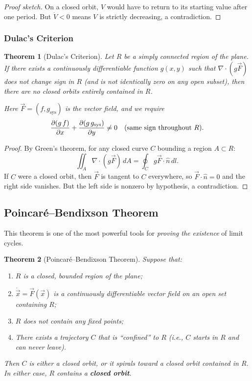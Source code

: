 \documentclass[11pt,letterpaper]{article}
\theoremstyle{definition}
\theoremstyle{plain}
\newtheorem{theorem}{Theorem}[section]
\theoremstyle{remark}
\begin{document}
\begin{proof}[Proof sketch]
On a closed orbit, $V$ would have to return to its starting value after one
period.  But $\dot{V}<0$ means $V$ is strictly decreasing, a contradiction.
\end{proof}

\subsubsection{Dulac's Criterion}

\begin{theorem}[Dulac's Criterion]\label{thm:dulac}
Let $R$ be a simply connected region of the plane.  If there exists a
continuously differentiable function $g(x,y)$ such that
$\nabla\cdot(g\vec{F})$ does not change sign in $R$ (and is not
identically zero on any open subset), then there are no closed orbits
entirely contained in $R$.

Here $\vec{F} = (f, g_{\text{sys}})$ is the vector field, and we require
\begin{equation}
  \pdv{(g\,f)}{x} + \pdv{(g\,g_{\text{sys}})}{y} \neq 0
  \quad\text{(same sign throughout $R$)}.
\end{equation}
\end{theorem}
\begin{proof}
By Green's theorem, for any closed curve $C$ bounding a region $A\subset R$:
\[
  \iint_A \nabla\cdot(g\vec{F})\,dA = \oint_C g\vec{F}\cdot\hat{n}\,dl.
\]
If $C$ were a closed orbit, then $\vec{F}$ is tangent to $C$ everywhere, so
$\vec{F}\cdot\hat{n}=0$ and the right side vanishes.  But the left side is
nonzero by hypothesis, a contradiction.
\end{proof}

\subsection{Poincar\'e--Bendixson Theorem}

This theorem is one of the most powerful tools for \emph{proving the
existence} of limit cycles.

\begin{theorem}[Poincar\'e--Bendixson Theorem]\label{thm:PB}
Suppose that:
\begin{enumerate}[leftmargin=2em]
\item $R$ is a closed, bounded region of the plane;
\item $\dot{\vec{x}} = \vec{F}(\vec{x})$ is a continuously differentiable
      vector field on an open set containing $R$;
\item $R$ does not contain any fixed points;
\item There exists a trajectory $C$ that is ``confined'' to $R$
      (i.e., $C$ starts in $R$ and can never leave).
\end{enumerate}
Then $C$ is either a closed orbit, or it spirals toward a closed orbit
contained in $R$.  In either case, $R$ contains a \textbf{closed orbit}.
\end{theorem}
\end{document}
